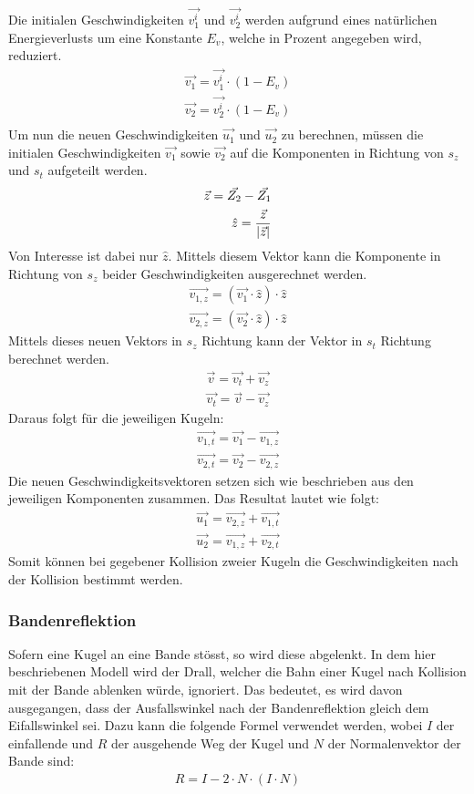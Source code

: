 Die initialen Geschwindigkeiten $\vec{v^i_1}$ und $\vec{v^i_2}$ werden aufgrund eines natürlichen Energieverlusts um eine
Konstante $E_v$, welche in Prozent angegeben wird, reduziert.
\begin{align}
    \vec{v_1} = \vec{v^i_1} \cdot (1 - E_v)\\
    \vec{v_2} = \vec{v^i_2} \cdot (1 - E_v)\\
\end{align}
Um nun die neuen Geschwindigkeiten $\vec{u_1}$ und $\vec{u_2}$ zu berechnen, müssen die initialen Geschwindigkeiten
$\vec{v_1}$ sowie $\vec{v_2}$ auf die Komponenten in Richtung von $s_z$ und $s_t$ aufgeteilt werden.
\begin{align}
    \vec{z} = \vec{Z_2} - \vec{Z_1}\\
    \hat{z} = \frac{\vec{z}}{\lvert \vec{z} \rvert}
\end{align}
Von Interesse ist dabei nur $\hat{z}$. Mittels diesem Vektor kann die Komponente in Richtung von $s_z$ beider Geschwindigkeiten
ausgerechnet werden.
\begin{align}
    \vec{v_{1,z}} = (\vec{v_1} \cdot \hat{z}) \cdot \hat{z}\\
    \vec{v_{2,z}} = (\vec{v_2} \cdot \hat{z}) \cdot \hat{z}
\end{align}
Mittels dieses neuen Vektors in $s_z$ Richtung kann der Vektor in $s_t$ Richtung berechnet werden.
\begin{align}
    \vec{v} = \vec{v_t} + \vec{v_z}\\
    \vec{v_t} = \vec{v} - \vec{v_z}
\end{align}
Daraus folgt für die jeweiligen Kugeln:
\begin{align}
    \vec{v_{1,t}} = \vec{v_1} - \vec{v_{1,z}}\\
    \vec{v_{2,t}} = \vec{v_2} - \vec{v_{2,z}}
\end{align}
Die neuen Geschwindigkeitsvektoren setzen sich wie beschrieben aus den jeweiligen Komponenten zusammen.
Das Resultat lautet wie folgt:
\begin{align}
    \vec{u_1} = \vec{v_{2,z}} + \vec{v_{1,t}}\\
    \vec{u_2} = \vec{v_{1,z}} + \vec{v_{2,t}}
\end{align}
Somit können bei gegebener Kollision zweier Kugeln die Geschwindigkeiten nach der Kollision bestimmt werden.

\subsubsection{Bandenreflektion}
Sofern eine Kugel an eine Bande stösst, so wird diese abgelenkt. In dem hier beschriebenen Modell wird der Drall\cite{wiki.spin:1},
welcher die Bahn einer Kugel nach Kollision mit der Bande ablenken würde, ignoriert.
Das bedeutet, es wird davon ausgegangen, dass der Ausfallswinkel nach der Bandenreflektion gleich dem Eifallswinkel sei.
Dazu kann die folgende Formel\cite{paulbourke.reflected_ray:1} verwendet werden, wobei $I$ der einfallende
und $R$ der ausgehende Weg der Kugel und $N$ der Normalenvektor der Bande sind:
\begin{align}
    R = I - 2 \cdot N \cdot (I \cdot N)
\end{align}


